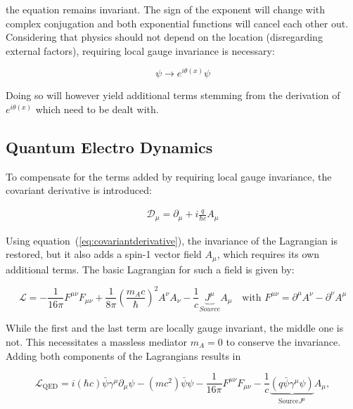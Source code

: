 \noindent the equation remains invariant. The sign of the exponent will change with complex conjugation and both exponential functions will cancel each other out. Considering that physics should not depend on the location (disregarding external factors), requiring local gauge invariance is necessary:

\begin{equation}
  \label{eq:localgaugeinv}
  \psi \rightarrow e^{i \theta(x)} \psi
\end{equation}

\noindent Doing so will however yield additional terms stemming from the derivation of $e^{i \theta(x)}$ which need to be dealt with. 

\subsection{Quantum Electro Dynamics}
\label{sec:qed}

To compensate for the terms added by requiring local gauge invariance, the covariant derivative is introduced:

\begin{align}
  \label{eq:covariantderivative}
  \mathcal{D}_\mu = \partial_\mu + i \frac{q}{\hbar c} A_\mu
\end{align}

\noindent Using equation~(\ref{eq:covariantderivative}), the invariance of the Lagrangian is restored, but it also adds a spin-1 vector field $A_\mu$, which requires its own additional terms. The basic Lagrangian for such a field is given by:

\begin{equation}
  \label{eq:procalagrangian}
  \mathcal{L} = - \frac{1}{16 \pi} F^{\mu \nu} F_{\mu \nu} + \frac{1}{8 \pi} \left( \frac{m_A c}{\hbar} \right)^2 A^\nu A_\nu - \frac{1}{c} \underbrace{J^\mu}_{Source} A_\mu \quad \text{with } F^{\mu \nu} = \partial^\mu A^\nu - \partial^\nu A^\mu
\end{equation}

\noindent While the first and the last term are locally gauge invariant, the middle one is not. This necessitates a massless mediator $m_A = 0$ to conserve the invariance. Adding both components of the Lagrangians results in

\begin{equation}
  \label{eq:qedlagrangian}
  \mathcal{L}_{\text{QED}} = i (\hbar c) \bar{\psi} \gamma^\mu \partial_\mu \psi - (m c^2) \bar{\psi} \psi - \frac{1}{16 \pi} F^{\mu \nu} F_{\mu \nu} - \frac{1}{c} \underbrace{(q \bar{\psi} \gamma^\mu  \psi)}_{\text{Source} J^\mu} A_\mu,
\end{equation}


